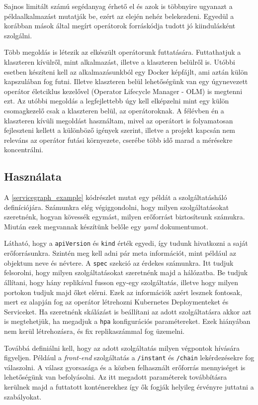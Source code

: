 Sajnos limitált számú segédanyag érhető el és azok is többnyire ugyanazt a példaalkalmazást mutatják be, ezért az elején nehéz belekezdeni. Egyedül a korábban mások által megírt operátorok forráskódja tudott jó kiindulásként szolgálni.

Több megoldás is létezik az elkészült operátorunk futtatására. Futtathatjuk a klaszteren kívülről, mint alkalmazást, illetve a klaszteren belülről is. Utóbbi esetben készíteni kell az alkalmazásunkból egy Docker képfájlt, ami aztán külön kapszulában fog futni. Illetve klaszteren belül lehetőségünk van egy úgynevezett operátor életciklus kezelővel (Operator Lifecycle Manager - OLM) is megtenni ezt. Az utóbbi megoldás a legfejlettebb úgy kell elképzelni mint egy külön csomagkezelő csak a klaszteren belül, az operátoroknak. A félévben én a klaszteren kívüli megoldást használtam, mivel az operátort is folyamatosan fejleszteni kellett a különböző igények szerint, illetve a projekt kapcsán nem releváns az operátor futási környezete, cserébe több idő marad a mérésekre koncentrálni.

\subsection{Használata}
A \ref{servicegraph_example} kódrészlet mutat egy példát a szolgáltatásháló definíciójára. Számunkra elég végiggondolni, hogy milyen szolgáltatásokat szeretnénk, hogyan kövessék egymást, milyen erőforrást biztosítsunk számukra. Miután ezek megvannak készítünk belőle egy \textit{yaml} dokumentumot.

Látható, hogy a \verb+apiVersion+ és \verb+kind+ érték egyedi, így tudunk hivatkozni a saját erőforrásunkra. Szintén meg kell adni pár meta információt, mint például az objektum neve és névtere. A \verb+spec+ szekció az érdekes számunkra. Itt tudjuk felsorolni, hogy milyen szolgáltatásokat szeretnénk majd a hálózatba. Be tudjuk állítani, hogy hány replikával fusson egy-egy szolgáltatás, illetve hogy milyen portokon tudjuk majd őket elérni. Ezek az információk azért lesznek fontosak, mert ez alapján fog az operátor létrehozni Kubernetes Deploymenteket és Serviceket. Ha szeretnénk skálázást is beállítani az adott szolgáltatásra akkor azt is megtehetjük, ha megadjuk a \verb+hpa+ konfigurációs paramétereket. Ezek hiányában nem kerül létrehozásra, és fix replikaszámmal fog üzemelni.

Továbbá definiálni kell, hogy az adott szolgáltatás milyen végpontok hívására figyeljen. Például a \textit{front-end} szolgáltatás a \verb+/instant+ és \verb+/chain+ lekérdezésekre fog válaszolni. A válasz gyorsasága és a közben felhasznált erőforrás mennyiséget is lehetőségünk van befolyásolni. Az itt megadott paraméterek továbbításra kerülnek majd a futtatott konténerekhez így ők fogják helyileg érvényre juttatni a szabályokat. 

